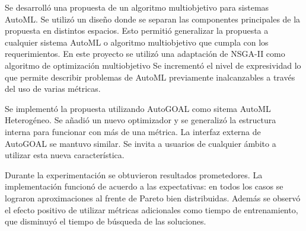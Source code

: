 \begin{conclusions}
    Se desarroll\'o una propuesta de un algoritmo multiobjetivo para sistemas AutoML. Se utiliz\'o un dise\~no donde se separan las componentes principales de la propuesta en distintos espacios. Esto permiti\'o generalizar la propuesta a cualquier sistema AutoML o algoritmo multiobjetivo que cumpla con los requerimientos. En este proyecto se utiliz\'o una adaptaci\'on de NSGA-II  como algoritmo de optimizaci\'on multiobjetivo
    Se increment\'o el nivel de expresividad lo que permite describir problemas de AutoML previamente inalcanzables a trav\'es del uso de varias m\'etricas. 


    Se implement\'o la propuesta utilizando AutoGOAL  como sitema AutoML Heterog\'eneo. Se a\~nadi\'o un nuevo optimizador y se generaliz\'o la estructura interna para funcionar con m\'as de una m\'etrica. La interfaz externa de AutoGOAL se mantuvo similar. Se invita a usuarios de cualquier \'ambito a utilizar esta nueva caracter\'istica.

    Durante la experimentaci\'on se obtuvieron resultados prometedores. La implementaci\'on funcion\'o de acuerdo a las expectativas: en todos los casos se lograron aproximaciones al frente de Pareto bien distribuidas. Adem\'as se observ\'o el efecto positivo de utilizar m\'etricas adicionales como tiempo de entrenamiento, que disminuy\'o el tiempo de b\'usqueda de las soluciones.




\end{conclusions}

